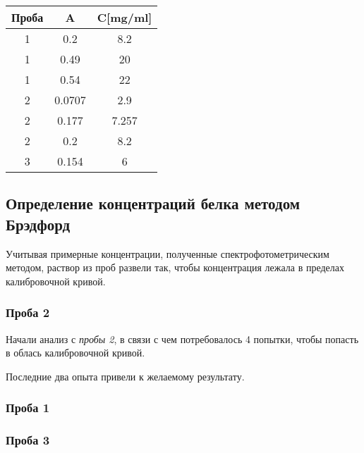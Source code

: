 \begin{tabular}{|c|c|c|}
\hline
Проба & A & C[mg/ml] \\
\hline
1 & 0.2 & 8.2 \\
1 & 0.49 & 20 \\
1 & 0.54 & 22 \\
\hline
2 & 0.0707 & 2.9 \\
2 & 0.177 & 7.257 \\
2 & 0.2 & 8.2 \\
\hline
3 & 0.154 & 6 \\
\hline
\end{tabular}

\subsection{Определение концентраций белка методом Брэдфорд}

Учитывая примерные концентрации, полученные спектрофотометрическим методом,
раствор из проб развели так, чтобы концентрация лежала в пределах
калибровочной кривой.

\subsubsection{Проба 2}
Начали анализ с \emph{пробы 2}, в связи с чем потребовалось 4 попытки,
чтобы попасть в облась калибровочной кривой.

\def\svgwidth{\linewidth}
\def\svgwidth{\linewidth}
\def\svgwidth{\linewidth}
\def\svgwidth{\linewidth}

Последние два опыта привели к желаемому результату.

\subsubsection{Проба 1}
\def\svgwidth{\linewidth}

\subsubsection{Проба 3}
\def\svgwidth{\linewidth}

